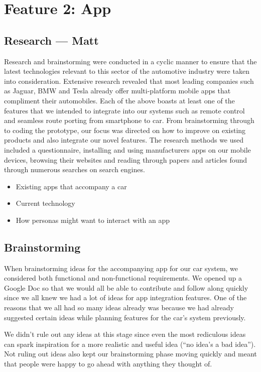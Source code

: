 \documentclass{article}
\begin{document}
%
%
\section{Feature 2: App}\label{sec:app}

\subsection{Research --- Matt}\label{ssec:app-research}
Research and brainstorming were conducted in a cyclic manner to ensure that the latest technologies relevant to this sector of the automotive industry were taken into consideration. Extensive research revealed that most leading companies such as Jaguar, BMW and Tesla already offer multi-platform mobile apps that compliment their automobiles. Each of the above boasts at least one of the features that we intended to integrate into our systems such as remote control and seamless route porting from smartphone to car. From brainstorming through to coding the prototype, our focus was directed on how to improve on existing products and also integrate our novel features.
The research methods we used included a questionnaire, installing and using manufacturers apps on our mobile devices, browsing their websites and reading through papers and articles found through numerous searches on search engines.
\begin{itemize}
  \item Existing apps that accompany a car
  \item Current technology
  \item How personas might want to interact with an app
\end{itemize}

\subsection{Brainstorming}\label{ssec:app-brainstorming} %
When brainstorming ideas for the accompanying app for our car system, we considered both functional and non-functional requirements. We opened up a Google Doc so that we would all be able to contribute and follow along quickly since we all knew we had a lot of ideas for app integration features. One of the reasons that we all had so many ideas already was because we had already suggested certain ideas while planning features for the car's system previously.

We didn't rule out any ideas at this stage since even the most rediculous ideas can spark inspiration for a more realistic and useful idea (``no idea's a bad idea''). Not ruling out ideas also kept our brainstorming phase moving quickly and meant that people were happy to go ahead with anything they thought of.
\end{document}
